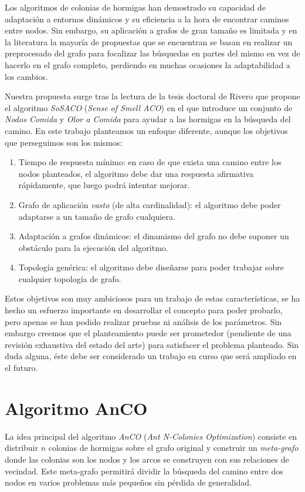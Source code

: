 \documentclass{llncs}
\begin{document}
Los algoritmos de colonias de hormigas han demostrado su capacidad de adaptación a entornos dinámicos y su eficiencia a la hora de encontrar caminos entre nodos.
Sin embargo, su aplicación a grafos de gran tamaño es limitada y en la literatura la mayoría de propuestas que se encuentran se basan en realizar un preprocesado del grafo para focalizar las búsquedas en partes del mismo en vez de hacerlo en el grafo completo, perdiendo en muchas ocasiones la adaptabilidad a los cambios.

Nuestra propuesta surge tras la lectura de la tesis doctoral de Rivero \cite{Rivero2011} que propone el algoritmo \textit{SoSACO} (\textit{Sense of Smell ACO}) en el que introduce un conjunto de \textit{Nodos Comida} y \textit{Olor a Comida} para ayudar a las hormigas en la búsqueda del camino.
En este trabajo planteamos un enfoque diferente, aunque los objetivos que perseguimos son los mismos:
\begin{enumerate}
  \item Tiempo de respuesta mínimo: en caso de que exista una camino entre los nodos planteados, el algoritmo debe dar una respuesta afirmativa rápidamente, que luego podrá intentar mejorar.
  \item Grafo de aplicación \textit{vasto} (de alta cardinalidad): el algoritmo debe poder adaptarse a un tamaño de grafo cualquiera.
  \item Adaptación a grafos dinámicos: el dinamismo del grafo no debe suponer un obstáculo para la ejecución del algoritmo.
  \item Topología genérica: el algoritmo debe diseñarse para poder trabajar sobre cualquier topología de grafo.
\end{enumerate}

Estos objetivos son muy ambiciosos para un trabajo de estas características, se ha hecho un esfuerzo importante en desarrollar el concepto para poder probarlo, pero apenas se han podido realizar pruebas ni análisis de los parámetros.
Sin embargo creemos que el planteamiento puede ser prometedor (pendiente de una revisión exhaustiva del estado del arte) para satisfacer el problema planteado.
Sin duda alguna, éste debe ser considerado un trabajo en curso que será ampliado en el futuro.







\section{Algoritmo AnCO}
La idea principal del algoritmo \textit{AnCO} (\textit{Ant N-Colonies Optimization}) consiste en distribuir $n$ colonias de hormigas sobre el grafo original y construir un \textit{meta-grafo} donde las colonias son los nodos y los arcos se construyen con sus relaciones de vecindad.
Este meta-grafo permitirá dividir la búsqueda del camino entre dos nodos en varios problemas más pequeños sin pérdida de generalidad.
\end{document}
